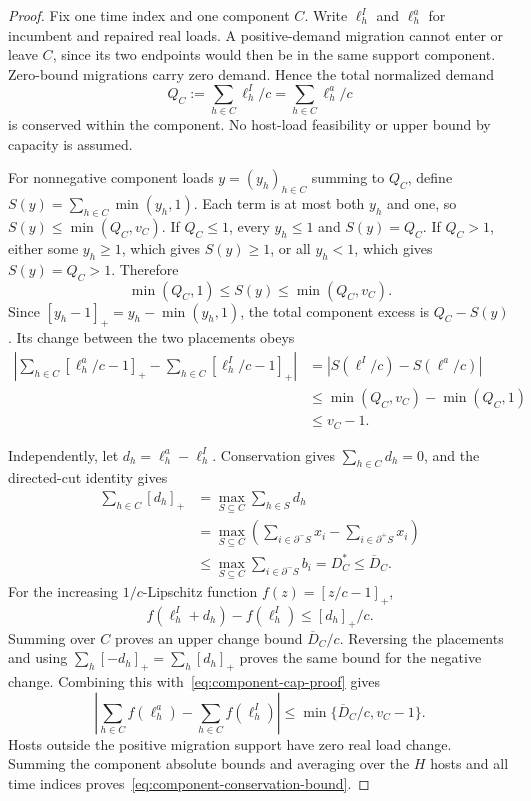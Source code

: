 \documentclass[11pt]{article}
\begin{document}
\begin{proof}
Fix one time index and one component $C$. Write $\ell_h^I$ and $\ell_h^a$ for incumbent and repaired real loads. A positive-demand migration cannot enter or leave $C$, since its two endpoints would then be in the same support component. Zero-bound migrations carry zero demand. Hence the total normalized demand
\begin{equation}
Q_C:=\sum_{h\in C}\ell_h^I/c=\sum_{h\in C}\ell_h^a/c
\end{equation}
is conserved within the component. No host-load feasibility or upper bound by capacity is assumed.

For nonnegative component loads $y=(y_h)_{h\in C}$ summing to $Q_C$, define $S(y)=\sum_{h\in C}\min(y_h,1)$. Each term is at most both $y_h$ and one, so $S(y)\le\min(Q_C,v_C)$. If $Q_C\le1$, every $y_h\le1$ and $S(y)=Q_C$. If $Q_C>1$, either some $y_h\ge1$, which gives $S(y)\ge1$, or all $y_h<1$, which gives $S(y)=Q_C>1$. Therefore
\begin{equation}
\min(Q_C,1)\le S(y)\le\min(Q_C,v_C).
\end{equation}
Since $[y_h-1]_+=y_h-\min(y_h,1)$, the total component excess is $Q_C-S(y)$. Its change between the two placements obeys
\begin{align}
\left|\sum_{h\in C}[\ell_h^a/c-1]_+-\sum_{h\in C}[\ell_h^I/c-1]_+\right|
&=|S(\ell^I/c)-S(\ell^a/c)|\\
&\le\min(Q_C,v_C)-\min(Q_C,1)\\
&\le v_C-1.\label{eq:component-cap-proof}
\end{align}

Independently, let $d_h=\ell_h^a-\ell_h^I$. Conservation gives $\sum_{h\in C}d_h=0$, and the directed-cut identity gives
\begin{align}
\sum_{h\in C}[d_h]_+
&=\max_{S\subseteq C}\sum_{h\in S}d_h\\
&=\max_{S\subseteq C}\left(\sum_{i\in\partial^-S}x_i-\sum_{i\in\partial^+S}x_i\right)\\
&\le\max_{S\subseteq C}\sum_{i\in\partial^-S}b_i=D_C^*\le\overline D_C.
\end{align}
For the increasing $1/c$-Lipschitz function $f(z)=[z/c-1]_+$,
\begin{equation}
f(\ell_h^I+d_h)-f(\ell_h^I)\le[d_h]_+/c.
\end{equation}
Summing over $C$ proves an upper change bound $\overline D_C/c$. Reversing the placements and using $\sum_h[-d_h]_+=\sum_h[d_h]_+$ proves the same bound for the negative change. Combining this with~\eqref{eq:component-cap-proof} gives
\begin{equation}
\left|\sum_{h\in C}f(\ell_h^a)-\sum_{h\in C}f(\ell_h^I)\right|\le\min\{\overline D_C/c,v_C-1\}.
\end{equation}
Hosts outside the positive migration support have zero real load change. Summing the component absolute bounds and averaging over the $H$ hosts and all time indices proves~\eqref{eq:component-conservation-bound}.


\end{proof}
\end{document}
